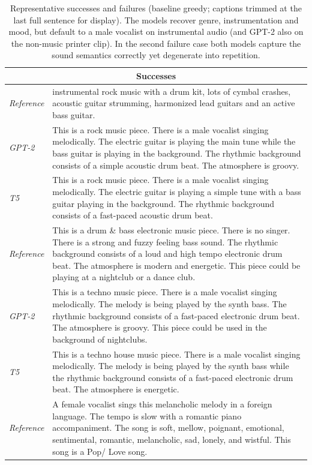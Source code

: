 \begin{table}[t]
\centering
\footnotesize
\caption{Representative successes and failures (baseline greedy; captions trimmed at the last full sentence for display). The models recover genre, instrumentation and mood, but default to a male vocalist on instrumental audio (and GPT-2 also on the non-music printer clip). In the second failure case both models capture the sound semantics correctly yet degenerate into repetition.}
\label{tab:qual}
\begin{tabularx}{\textwidth}{lX}
\toprule
\multicolumn{2}{c}{\textbf{Successes}}\\
\midrule
\addlinespace[2pt]
\emph{Reference} & instrumental rock music with a drum kit, lots of cymbal crashes, acoustic guitar strumming, harmonized lead guitars and an active bass guitar. \\
\emph{GPT-2} & This is a rock music piece. There is a male vocalist singing melodically. The electric guitar is playing the main tune while the bass guitar is playing in the background. The rhythmic background consists of a simple acoustic drum beat. The atmosphere is groovy. \\
\emph{T5} & This is a rock music piece. There is a male vocalist singing melodically. The electric guitar is playing a simple tune with a bass guitar playing in the background. The rhythmic background consists of a fast-paced acoustic drum beat. \\
\midrule
\addlinespace[2pt]
\emph{Reference} & This is a drum \& bass electronic music piece. There is no singer. There is a strong and fuzzy feeling bass sound. The rhythmic background consists of a loud and high tempo electronic drum beat. The atmosphere is modern and energetic. This piece could be playing at a nightclub or a dance club. \\
\emph{GPT-2} & This is a techno music piece. There is a male vocalist singing melodically. The melody is being played by the synth bass. The rhythmic background consists of a fast-paced electronic drum beat. The atmosphere is groovy. This piece could be used in the background of nightclubs. \\
\emph{T5} & This is a techno house music piece. There is a male vocalist singing melodically. The melody is being played by the synth bass while the rhythmic background consists of a fast-paced electronic drum beat. The atmosphere is energetic. \\
\midrule
\addlinespace[2pt]
\emph{Reference} & A female vocalist sings this melancholic melody in a foreign language. The tempo is slow with a romantic piano accompaniment. The song is soft, mellow, poignant, emotional, sentimental, romantic, melancholic, sad, lonely, and wistful. This song is a Pop/ Love song. \\

\end{tabularx}
\end{table}
